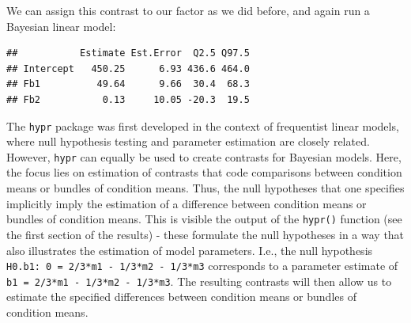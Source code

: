 \documentclass[12pt,]{krantz}
\newenvironment{Shaded}{\begin{snugshade}}{\end{snugshade}}
\newcommand{\KeywordTok}[1]{\textcolor[rgb]{0.13,0.29,0.53}{\textbf{#1}}}
\newcommand{\DataTypeTok}[1]{\textcolor[rgb]{0.13,0.29,0.53}{#1}}
\newcommand{\DecValTok}[1]{\textcolor[rgb]{0.00,0.00,0.81}{#1}}
\newcommand{\StringTok}[1]{\textcolor[rgb]{0.31,0.60,0.02}{#1}}
\newcommand{\OperatorTok}[1]{\textcolor[rgb]{0.81,0.36,0.00}{\textbf{#1}}}
\newcommand{\NormalTok}[1]{#1}
\theoremstyle{definition}
\theoremstyle{definition}
\theoremstyle{definition}
\theoremstyle{remark}
\begin{document}
We can assign this contrast to our factor as we did before, and again
run a Bayesian linear model:

\begin{Shaded}
\end{Shaded}

\begin{verbatim}
##           Estimate Est.Error  Q2.5 Q97.5
## Intercept   450.25      6.93 436.6 464.0
## Fb1          49.64      9.66  30.4  68.3
## Fb2           0.13     10.05 -20.3  19.5
\end{verbatim}

The \texttt{hypr} package was first developed in the context of
frequentist linear models, where null hypothesis testing and parameter
estimation are closely related. However, \texttt{hypr} can equally be
used to create contrasts for Bayesian models. Here, the focus lies on
estimation of contrasts that code comparisons between condition means or
bundles of condition means. Thus, the null hypotheses that one specifies
implicitly imply the estimation of a difference between condition means
or bundles of condition means. This is visible the output of the
\texttt{hypr()} function (see the first section of the results) - these
formulate the null hypotheses in a way that also illustrates the
estimation of model parameters. I.e., the null hypothesis
\texttt{H0.b1:\ 0\ =\ 2/3*m1\ -\ 1/3*m2\ -\ 1/3*m3} corresponds to a
parameter estimate of \texttt{b1\ =\ 2/3*m1\ -\ 1/3*m2\ -\ 1/3*m3}. The
resulting contrasts will then allow us to estimate the specified
differences between condition means or bundles of condition means.
\end{document}

